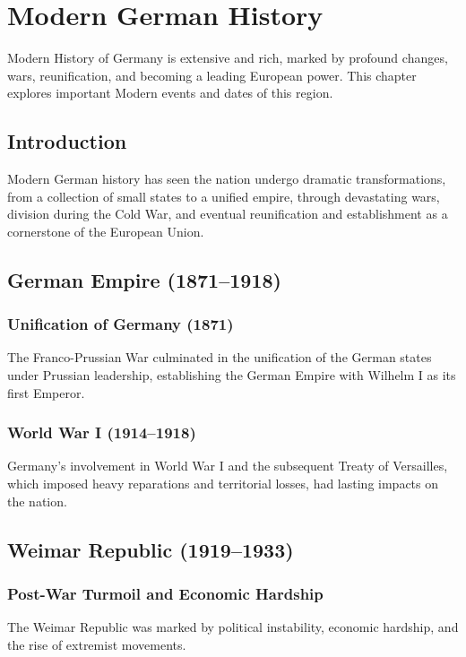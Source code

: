 \documentclass[a4paper,12pt]{book}
\begin{document}
\chapter{Modern German History}
\label{ch:modern-german-history}

Modern History of Germany is extensive and rich, marked by profound changes, wars, reunification, and becoming a leading European power. This chapter explores important Modern events and dates of this region.

\section{Introduction}
\label{sec:introduction-modern-germany}
Modern German history has seen the nation undergo dramatic transformations, from a collection of small states to a unified empire, through devastating wars, division during the Cold War, and eventual reunification and establishment as a cornerstone of the European Union.

\section{German Empire (1871–1918)}
\label{sec:german-empire}
\subsection{Unification of Germany (1871)}
The Franco-Prussian War culminated in the unification of the German states under Prussian leadership, establishing the German Empire with Wilhelm I as its first Emperor.

\subsection{World War I (1914–1918)}
Germany’s involvement in World War I and the subsequent Treaty of Versailles, which imposed heavy reparations and territorial losses, had lasting impacts on the nation.

\section{Weimar Republic (1919–1933)}
\label{sec:weimar-republic}
\subsection{Post-War Turmoil and Economic Hardship}
The Weimar Republic was marked by political instability, economic hardship, and the rise of extremist movements.
\end{document}

